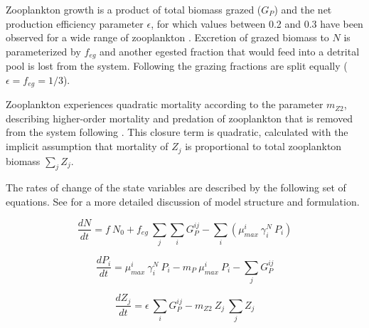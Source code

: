\documentclass[journal abbreviation, manuscript]{copernicus}
\begin{document}
Zooplankton growth is a product of total biomass grazed ($G_P$) and the net production efficiency parameter $\epsilon$, for which values between 0.2 and 0.3 have been observed for a wide range of zooplankton  \citep{Straile1997GrossGroup}. Excretion of grazed biomass to $N$ is parameterized by $f_{eg}$ and another egested fraction that would feed into a detrital pool is lost from the system. Following \citet{Banas2011b} the grazing fractions are split equally ($\epsilon = f_{eg} = 1/3$).

Zooplankton experiences quadratic mortality according to the parameter $m_{Z2}$, describing higher-order mortality and predation of zooplankton that is removed from the system following \citet{Edwards2000TheModels}. This closure term is quadratic, calculated with the implicit assumption that mortality of $Z_j$ is proportional to total zooplankton biomass $\sum_{j} Z_j$.

The rates of change of the state variables are described by the following set of equations. See \citet{Banas2011b} for a more detailed discussion of model structure and formulation.

\begin{equation}
    \frac{d N}{d t} = 
    f \ N_0 %
    +  f_{eg} \ \sum_{j} \sum_{i} G_P^{ij} %
    - \sum_{i} ( \mu_{max}^i \ \gamma_i^N \ P_i) %
\end{equation}

\begin{equation}
    \frac{d P_i}{d t} =
    \mu_{max}^i \  \gamma_i^N \   P_i  %
    - m_P  \ \mu_{max}^i \ P_i %
    - \sum_{j} G_P^{ij} %
\end{equation}

\begin{equation}
    \frac{d Z_j}{d t} =
    \epsilon \ \sum_{i} G_P^{ij} %
    - m_{Z2} \ Z_j \ \sum_{j} Z_j  %
\end{equation}
\end{document}
